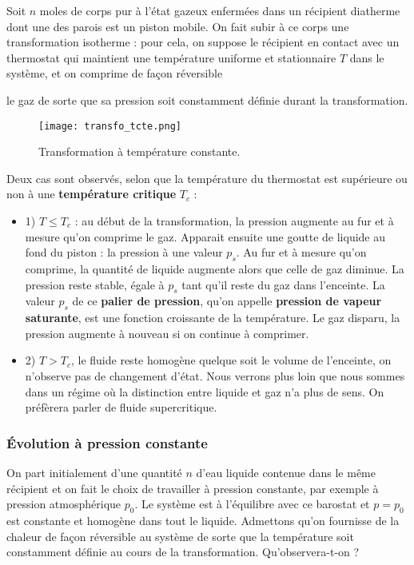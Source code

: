 \documentclass[11pt,a4paper]{report}
\begin{document}
Soit $n$ moles de corps pur à l'état gazeux enfermées dans un récipient diatherme dont une des parois est un piston mobile. On fait subir à ce corps une transformation isotherme : pour cela, on suppose le récipient en contact avec un thermostat qui maintient une température uniforme et stationnaire $T$ dans le système, et on comprime de façon réversible

 le gaz de sorte que sa pression soit constamment définie durant la transformation.\\

\begin{figure}[h!]
	\begin{center}
		\texttt{[image: transfo\_tcte.png]}
	\end{center}
	\caption{Transformation à température constante.}
\end{figure}

Deux cas sont observés, selon que la température du thermostat est supérieure ou non à une \textbf{température critique} $T_c$ :
\begin{itemize}
	\item 1\degree) $T \leq T_c$ : au début de la transformation, la pression augmente au fur et à 			mesure qu'on comprime le gaz. Apparait ensuite une goutte de liquide au fond du piston : la 		pression à une valeur $p_s$. Au fur et à mesure qu'on comprime, la quantité de liquide 				augmente alors que celle de gaz diminue. La pression reste stable, égale à $p_s$ tant qu'il 		reste du gaz dans l'enceinte. La valeur $p_s$ de ce \textbf{palier de pression}, qu'on 				appelle \textbf{pression de vapeur saturante}, est une fonction croissante de la 					température. Le gaz disparu, la pression augmente à nouveau si on continue à comprimer.\\ 
	\item 2\degree) $T > T_c$, le fluide reste homogène quelque soit le volume de l'enceinte, on 			n'observe pas de changement d'état. Nous verrons plus loin que nous sommes dans un régime 			où la distinction entre liquide et gaz n'a plus de sens. On préfèrera parler de fluide 				supercritique.
\end{itemize}
 
\subsubsection*{Évolution à pression constante}

On part initialement d'une quantité $n$ d'eau liquide contenue dans le même récipient et on fait le choix de travailler à pression constante, par exemple à pression atmosphérique $p_0$. Le système est à l'équilibre avec ce barostat et $p = p_0$ est constante et homogène dans tout le liquide. Admettons qu'on fournisse de la chaleur de façon réversible au système de sorte que la température soit constamment définie au cours de la transformation. Qu'observera-t-on ?\\
\end{document}
